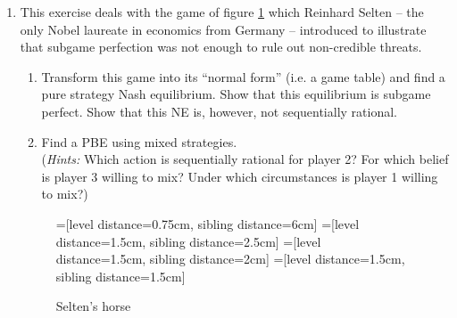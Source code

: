 \documentclass[a4paper,12pt]{article}
\begin{document}
\begin{enumerate}[resume]
\item This exercise deals with the game of figure \ref{fig:selten_ex} which Reinhard Selten -- the only Nobel laureate in economics from Germany -- introduced to illustrate that subgame perfection was not enough to rule out non-credible threats.
    \begin{enumerate}
    \item Transform this game into its ``normal form'' (i.e. a game table) and find a pure strategy Nash equilibrium. Show that this equilibrium is subgame perfect. Show that this NE is, however, not sequentially rational. 
    \item Find a PBE using mixed strategies.\\ (\emph{Hints:} Which action is sequentially rational for player 2? For which belief is player 3 willing to mix? Under which circumstances is player 1 willing to mix?)
    \end{enumerate}
    \begin{figure}[h]
\centering
=[level distance=0.75cm, sibling distance=6cm]
=[level distance=1.5cm, sibling distance=2.5cm]
=[level distance=1.5cm, sibling distance=2cm]
=[level distance=1.5cm, sibling distance=1.5cm]
\caption{Selten's horse}
\label{fig:selten_ex}
\end{figure}


\end{enumerate}
\end{document}
